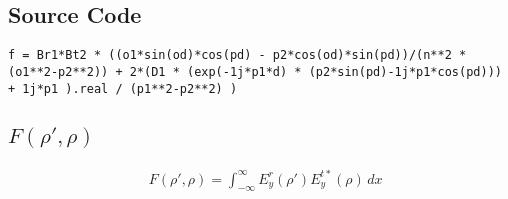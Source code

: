 \documentclass[11pt, oneside]{article}   	%
\begin{document}
\subsection{Source Code}

\begin{lstlisting}
f = Br1*Bt2 * ((o1*sin(od)*cos(pd) - p2*cos(od)*sin(pd))/(n**2 * (o1**2-p2**2)) + 2*(D1 * (exp(-1j*p1*d) * (p2*sin(pd)-1j*p1*cos(pd))) + 1j*p1 ).real / (p1**2-p2**2) )
\end{lstlisting}



\newpage


\subsection{$F(\rho ', \rho)$}

\begin{align*}
&F(\rho ',\rho) = \int_{-\infty}^{\infty} E_{y}^{r} (\rho ') E_{y}^{t*} (\rho) \, dx
\end{align*}
\end{document}
